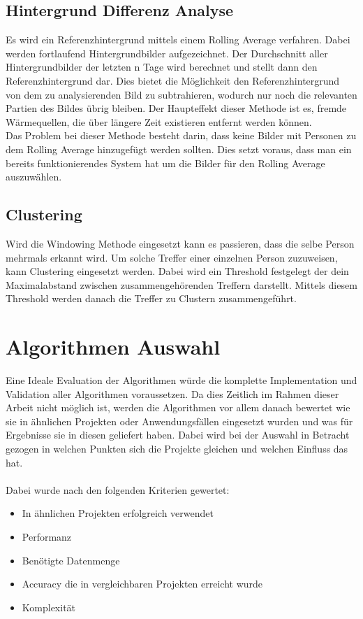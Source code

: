 \subsection{Hintergrund Differenz Analyse}

Es wird ein Referenzhintergrund mittels einem Rolling Average verfahren. Dabei werden fortlaufend Hintergrundbilder aufgezeichnet. Der Durchschnitt aller Hintergrundbilder der letzten n Tage wird berechnet und stellt dann den Referenzhintergrund dar. Dies bietet die Möglichkeit den Referenzhintergrund von dem zu analysierenden Bild zu subtrahieren, wodurch nur noch die relevanten Partien des Bildes übrig bleiben. Der Haupteffekt dieser Methode ist es, fremde Wärmequellen, die über längere Zeit existieren entfernt werden können.\\
Das Problem bei dieser Methode besteht darin, dass keine Bilder mit Personen zu dem Rolling Average hinzugefügt werden sollten. Dies setzt voraus, dass man ein bereits funktionierendes System hat um die Bilder für den Rolling Average auszuwählen.

\subsection{Clustering}

Wird die Windowing Methode eingesetzt kann es passieren, dass die selbe Person mehrmals erkannt wird. Um solche Treffer einer einzelnen Person zuzuweisen, kann Clustering eingesetzt werden. Dabei wird ein Threshold festgelegt der dein Maximalabstand zwischen zusammengehörenden Treffern darstellt. Mittels diesem Threshold werden danach die Treffer zu Clustern zusammengeführt.

\section{Algorithmen Auswahl}

Eine Ideale Evaluation der Algorithmen würde die komplette Implementation und Validation aller Algorithmen voraussetzen. Da dies Zeitlich im Rahmen dieser Arbeit nicht möglich ist, werden die Algorithmen vor allem danach bewertet wie sie in ähnlichen Projekten oder Anwendungsfällen eingesetzt wurden und was für Ergebnisse sie in diesen geliefert haben. Dabei wird bei der Auswahl in Betracht gezogen in welchen Punkten sich die Projekte gleichen und welchen Einfluss das hat.\\
\\
Dabei wurde nach den folgenden Kriterien gewertet:
\begin{itemize}
	\item In ähnlichen Projekten erfolgreich verwendet
	\item Performanz
	\item Benötigte Datenmenge
	\item Accuracy die in vergleichbaren Projekten erreicht wurde
	\item Komplexität
\end{itemize}

